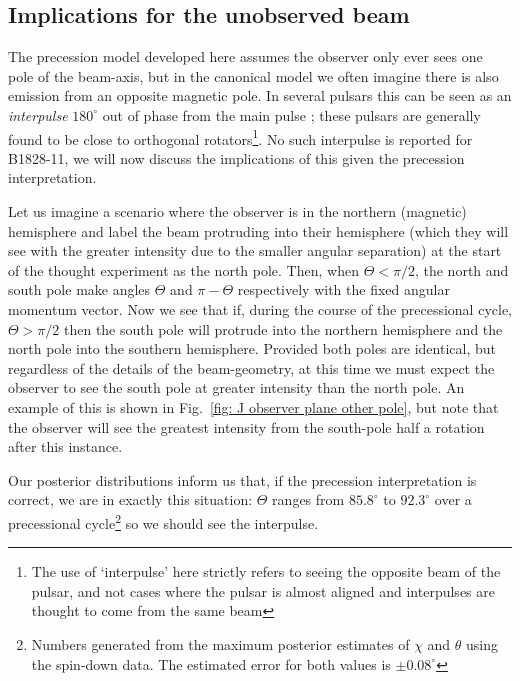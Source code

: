 \documentclass[../full_thesis/full_thesis.tex]{subfiles}
\newcommand{\degr}{^{\circ}}
\begin{document}
\begin{subappendices}
\section{Implications for the unobserved beam}
\label{sec: implications for the unobserved beam}
The precession model developed here assumes the observer only ever sees one
pole of the beam-axis, but in the canonical model we often imagine there is
also emission from an opposite magnetic pole. In several pulsars this can be
seen as an \emph{interpulse} $180\degr$ out of phase from the main pulse
\citep{Lyne1988, Maciesiak2011}; these pulsars are generally found to be close
to orthogonal rotators\footnote{The use of `interpulse' here strictly refers to
seeing the opposite beam of the pulsar, and not cases where the pulsar is
almost aligned and interpulses are thought to come from the same beam}. No
such interpulse is reported for B1828-11, we will now discuss the implications
of this given the precession interpretation.

Let us imagine a scenario where the observer is in the northern (magnetic)
hemisphere and label the beam protruding into their hemisphere (which they will
see with the greater intensity due to the smaller angular separation) at the
start of the thought experiment as the north pole.  Then, when $\Theta < \pi/2$,
the north and south
pole make angles $\Theta$ and $\pi-\Theta$ respectively with the fixed angular
momentum vector. Now we see that if, during the course of the precessional
cycle, $\Theta > \pi/2$ then the south pole will protrude into the northern
hemisphere and the north pole into the southern hemisphere. Provided both poles
are identical, but regardless of the details of the beam-geometry, at this time
we must expect the observer to see the south pole at greater intensity than the
north pole. An example of this is shown in Fig.~\ref{fig: J observer plane
other pole}, but note that the observer will see the greatest intensity from
the south-pole half a rotation after this instance.

Our posterior distributions inform us that, if the precession interpretation is
correct, we are in exactly this situation: $\Theta$ ranges from $85.8\degr$
to $92.3\degr$ over a precessional cycle\footnote{Numbers generated from the
maximum posterior estimates of $\chi$ and $\theta$ using the spin-down data.
The estimated error for both values is $\pm0.08\degr$} so we should see the
interpulse.


\end{subappendices}
\end{document}
